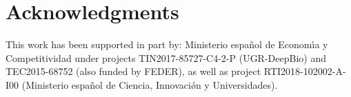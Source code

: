 \documentclass[10pt,journal,compsoc]{IEEEtran}
\begin{document}


\section*{Acknowledgments}

This work has been supported in part by: Ministerio espa\~{n}ol de
Econom\'{\i}a y Competitividad under projects  TIN2017-85727-C4-2-P (UGR-DeepBio) and TEC2015-68752 (also funded by FEDER), as well as project RTI2018-102002-A-I00 (Ministerio espa\~{n}ol de Ciencia, Innovaci\'{\o}n y Universidades).












\end{document}
